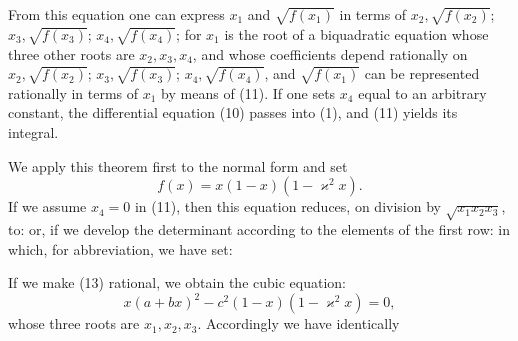 
From this equation one can express $x_1$ and $\sqrt{f(x_1)}$ 
in terms of $x_2, \sqrt{f(x_2)}$; $x_3, \sqrt{f(x_3)}$; $x_4, \sqrt{f(x_4)}$; for
$x_1$ is the root of a biquadratic equation whose three
other roots are $x_2, x_3, x_4$, and whose coefficients depend
rationally on $x_2, \sqrt{f(x_2)}$; $x_3, \sqrt{f(x_3)}$; $x_4, \sqrt{f(x_4)}$, and $\sqrt{f(x_1)}$ can
be represented rationally in terms of $x_1$ by means of (11). If one sets $x_4$ equal to an
arbitrary constant, the differential equation
(10) passes into (1), and (11) yields its integral.

We apply this theorem first to the normal form %
and set
\[ f(x) = x(1-x)(1-\varkappa^2 x). \]
If we assume $x_4 = 0$ in (11), then this
equation reduces, on division by $\sqrt{x_1 x_2 x_3}$, to:
or, if we develop the determinant according to the elements of the first
row:
in which, for abbreviation, we have set:

If we make (13) rational, we obtain the cubic
equation:
\[ x(a+bx)^2 - c^2(1-x)(1-\varkappa^2 x) = 0, \]
whose three roots are $x_1, x_2, x_3$. Accordingly we have identically
